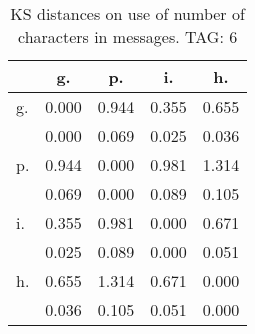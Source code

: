 \begin{table}[h!]
\begin{center}
\begin{tabular}{| l | c | c | c | c |}\hline
 & g. & p. & i. & h. \\\hline
g. & 0.000  & 0.944  & 0.355  & 0.655 \\\hline
 & 0.000  & 0.069  & 0.025  & 0.036 \\\hline
p. & 0.944  & 0.000  & 0.981  & 1.314 \\\hline
 & 0.069  & 0.000  & 0.089  & 0.105 \\\hline
i. & 0.355  & 0.981  & 0.000  & 0.671 \\\hline
 & 0.025  & 0.089  & 0.000  & 0.051 \\\hline
h. & 0.655  & 1.314  & 0.671  & 0.000 \\\hline
 & 0.036  & 0.105  & 0.051  & 0.000 \\\hline
\end{tabular}
\caption{KS distances on use of number of characters in messages. TAG: 6}
\end{center}
\end{table}
